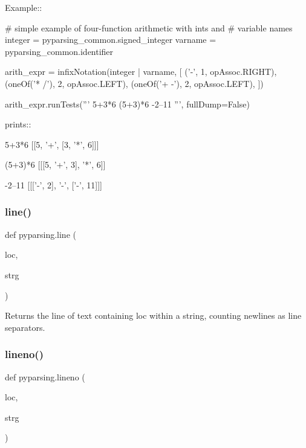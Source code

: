\begin{DoxyVerb}
Example::

    # simple example of four-function arithmetic with ints and
    # variable names
    integer = pyparsing_common.signed_integer
    varname = pyparsing_common.identifier

    arith_expr = infixNotation(integer | varname,
        [
        ('-', 1, opAssoc.RIGHT),
        (oneOf('* /'), 2, opAssoc.LEFT),
        (oneOf('+ -'), 2, opAssoc.LEFT),
        ])

    arith_expr.runTests('''
        5+3*6
        (5+3)*6
        -2--11
        ''', fullDump=False)

prints::

    5+3*6
    [[5, '+', [3, '*', 6]]]

    (5+3)*6
    [[[5, '+', 3], '*', 6]]

    -2--11
    [[['-', 2], '-', ['-', 11]]]
\end{DoxyVerb}
 \mbox{\label{namespacepyparsing_a4b96d613a62571b4c813681f5d785150}} 
\subsubsection{\texorpdfstring{line()}{line()}}
{\footnotesize\ttfamily def pyparsing.\+line (\begin{DoxyParamCaption}\item[{}]{loc,  }\item[{}]{strg }\end{DoxyParamCaption})}

\begin{DoxyVerb}Returns the line of text containing loc within a string, counting newlines as line separators.\end{DoxyVerb}
 \mbox{\label{namespacepyparsing_ab41b88fb8292745d6460e7363ce459d8}} 
\subsubsection{\texorpdfstring{lineno()}{lineno()}}
{\footnotesize\ttfamily def pyparsing.\+lineno (\begin{DoxyParamCaption}\item[{}]{loc,  }\item[{}]{strg }\end{DoxyParamCaption})}

